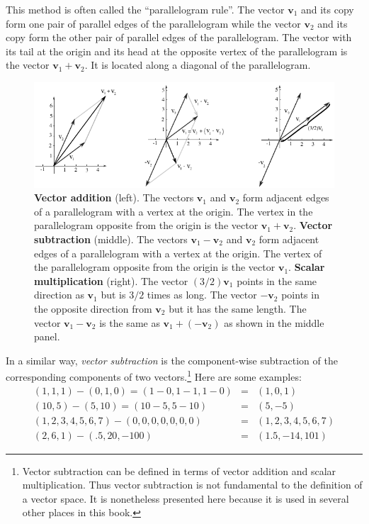    This method is often called the ``parallelogram rule''. The vector 
$\mathbf{v}_1$ and its copy form one pair of parallel edges of the 
parallelogram while the vector $\mathbf{v}_2$ and its copy form the other pair 
of parallel edges of the parallelogram. The vector with its tail at the origin 
and its head at the opposite vertex of the parallelogram is the vector 
$\mathbf{v}_1 + \mathbf{v}_2$. It is located along a diagonal of the 
parallelogram. 


\begin{figure}[h]
\centering
\includegraphics[scale=1.2]{./images/VectorOps.pdf}
\caption[Scott Hotton]{{\bf Vector addition} (left). The vectors $\mathbf{v}_1$ 
and $\mathbf{v}_2$ form adjacent edges of a parallelogram with a vertex at the
origin. The vertex in the parallelogram opposite from the origin is the 
vector $\mathbf{v}_1 + \mathbf{v}_2$. {\bf Vector subtraction} (middle). The 
vectors $\mathbf{v}_1 - \mathbf{v}_2$ and $\mathbf{v}_2$ form adjacent edges of
a parallelogram with a vertex at the origin. The vertex of the parallelogram 
opposite from the origin is the vector $\mathbf{v}_1$. {\bf Scalar 
multiplication} (right). The vector $(3/2)\mathbf{v}_1$ points in the same
direction as $\mathbf{v}_1$ but is $3/2$ times as long. The vector 
$-\mathbf{v}_2$ points in the opposite direction from $\mathbf{v}_2$ but
it has the same length. The vector $\mathbf{v}_1 - \mathbf{v}_2$ is the
same as $\mathbf{v}_1 + (-\mathbf{v}_2)$ as shown in the middle panel.}
\label{vectorMath}
\end{figure}

   In a similar way, \emph{vector subtraction} is the component-wise 
subtraction of the corresponding components of two vectors.\footnote{Vector 
subtraction can be defined in terms of vector addition and scalar 
multiplication. Thus vector subtraction is not fundamental to the definition 
of a vector space. It is nonetheless presented here because it is used in 
several other places in this book.}  Here are some examples:
\begin{eqnarray*}
(1,1,1) - (0,1,0) = (1-0,1-1,1-0) &=& (1,0,1) \\
(10,5) - (5,10) = (10-5,5-10) &=& (5,-5) \\
(1,2,3,4,5,6,7) - (0,0,0,0,0,0,0) &=& (1,2,3,4,5,6,7) \\
(2,6,1) - (.5,20,-100) &=& (1.5,-14,101)
\end{eqnarray*}

